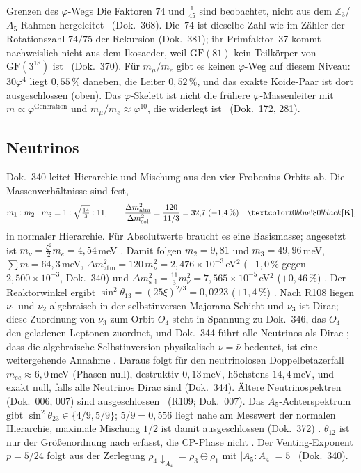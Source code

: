 \begin{ffkasten}{Grenzen des $\varphi$-Wegs}
Die Faktoren $74$ und $\tfrac1{45}$ sind beobachtet, nicht aus dem $\mathbb Z_3$/$A_5$-Rahmen
hergeleitet \SM\ (Dok.~368). Die~$74$ ist dieselbe Zahl wie im Zähler der Rotationszahl $74/75$
der Rekursion (Dok.~381); ihr Primfaktor~37 kommt nachweislich nicht aus dem Ikosaeder, weil
$\mathrm{GF}(81)$ kein Teilkörper von $\mathrm{GF}(3^{18})$ ist \BM\ (Dok.~370). Für $m_\mu/m_e$
gibt es keinen $\varphi$-Weg auf diesem Niveau: $30\varphi^4$ liegt $0{,}55\,\%$ daneben, die
Leiter $0{,}52\,\%$, und das exakte Koide-Paar ist dort ausgeschlossen (oben). Das
$\varphi$-Skelett ist nicht die frühere $\varphi$-Massenleiter mit $m\propto\varphi^{\text{Generation}}$
und $m_\mu/m_e\approx\varphi^{10}$, die widerlegt ist \XM\ (Dok.~172, 281).
\end{ffkasten}

\subsection{Neutrinos}

Dok.~340 leitet Hierarchie und Mischung aus den vier Frobenius-Orbits ab. Die Massenverhältnisse
sind fest,
\begin{equation}
  m_1:m_2:m_3=1:\sqrt{\tfrac{14}{3}}:11,\qquad
  \frac{\Delta m^2_{\text{atm}}}{\Delta m^2_{\text{sol}}}=\frac{120}{11/3}=32{,}7\ (-1{,}4\,\%)\quad\KM ,
\end{equation}
in normaler Hierarchie. Für Absolutwerte braucht es eine Basismasse; angesetzt ist
$m_\nu=\tfrac{\xi^2}{2}m_e=4{,}54$\,meV \SM. Damit folgen $m_2=9{,}81$ und $m_3=49{,}96$\,meV,
$\sum m=64{,}3$\,meV, $\Delta m^2_{\text{atm}}=120\,m_\nu^2=2{,}476\times10^{-3}$\,eV$^2$ ($-1{,}0\,\%$
gegen $2{,}500\times10^{-3}$, Dok.~340) und $\Delta m^2_{\text{sol}}=\tfrac{11}{3}m_\nu^2=7{,}565\times10^{-5}$\,eV$^2$
($+0{,}46\,\%$) \KM. Der Reaktorwinkel ergibt $\sin^2\theta_{13}=(25\xi)^{2/3}=0{,}0223$ ($+1{,}4\,\%$)
\KM. Nach R108 liegen $\nu_1$ und $\nu_2$ algebraisch in der selbstinversen Majorana-Schicht und
$\nu_3$ ist Dirac; diese Zuordnung von $\nu_3$ zum Orbit $O_4$ steht in Spannung zu Dok.~346, das
$O_4$ den geladenen Leptonen zuordnet, und Dok.~344 führt alle Neutrinos als Dirac \SM; dass die
algebraische Selbstinversion physikalisch $\nu=\bar\nu$ bedeutet, ist eine weitergehende Annahme
\SM. Daraus folgt für den neutrinolosen Doppelbetazerfall $m_{ee}\approx6{,}0$\,meV (Phasen null),
destruktiv $0{,}13$\,meV, höchstens $14{,}4$\,meV, und exakt null, falls alle Neutrinos Dirac sind
(Dok.~344). Ältere Neutrinospektren (Dok.~006, 007) sind ausgeschlossen \XM\ (R109; Dok.~007). Das $A_5$-Achterspektrum gibt $\sin^2\theta_{23}\in\{4/9,5/9\}$; $5/9=0{,}556$ liegt
nahe am Messwert der normalen Hierarchie, maximale Mischung $1/2$ ist damit ausgeschlossen
(Dok.~372) \KM. $\theta_{12}$ ist nur der Größenordnung nach erfasst, die CP-Phase nicht \SM. Der
Venting-Exponent $p=5/24$ folgt aus der Zerlegung $\rho_4\!\downarrow_{A_4}=\rho_3\oplus\rho_1$ mit
$|A_5:A_4|=5$ \BM\ (Dok.~340).

